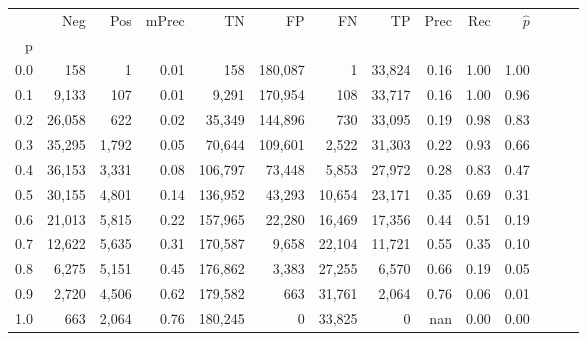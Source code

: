 \begin{tabular}{rrrrrrrrrrrrrr}
\toprule
{} &     Neg &    Pos & mPrec &       TN &       FP &      FN &      TP &  Prec &   Rec & $\hat{p}$ \\
p   &         &        &       &          &          &         &         &       &       &           \\
\midrule
0.0 &     158 &      1 &  0.01 &      158 &  180,087 &       1 &  33,824 &  0.16 &  1.00 &      1.00 \\
0.1 &   9,133 &    107 &  0.01 &    9,291 &  170,954 &     108 &  33,717 &  0.16 &  1.00 &      0.96 \\
0.2 &  26,058 &    622 &  0.02 &   35,349 &  144,896 &     730 &  33,095 &  0.19 &  0.98 &      0.83 \\
0.3 &  35,295 &  1,792 &  0.05 &   70,644 &  109,601 &   2,522 &  31,303 &  0.22 &  0.93 &      0.66 \\
0.4 &  36,153 &  3,331 &  0.08 &  106,797 &   73,448 &   5,853 &  27,972 &  0.28 &  0.83 &      0.47 \\
0.5 &  30,155 &  4,801 &  0.14 &  136,952 &   43,293 &  10,654 &  23,171 &  0.35 &  0.69 &      0.31 \\
0.6 &  21,013 &  5,815 &  0.22 &  157,965 &   22,280 &  16,469 &  17,356 &  0.44 &  0.51 &      0.19 \\
0.7 &  12,622 &  5,635 &  0.31 &  170,587 &    9,658 &  22,104 &  11,721 &  0.55 &  0.35 &      0.10 \\
0.8 &   6,275 &  5,151 &  0.45 &  176,862 &    3,383 &  27,255 &   6,570 &  0.66 &  0.19 &      0.05 \\
0.9 &   2,720 &  4,506 &  0.62 &  179,582 &      663 &  31,761 &   2,064 &  0.76 &  0.06 &      0.01 \\
1.0 &     663 &  2,064 &  0.76 &  180,245 &        0 &  33,825 &       0 &   nan &  0.00 &      0.00 \\
\bottomrule
\end{tabular}
